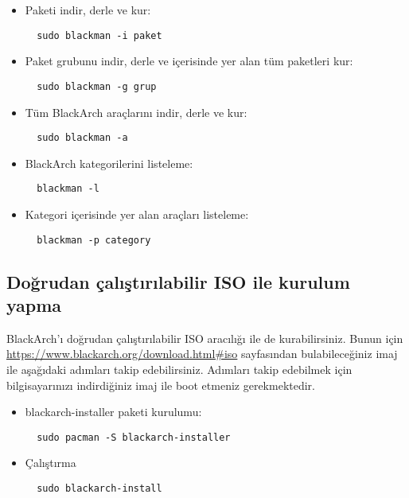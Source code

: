 \documentclass[a4paper, oneside, 11pt]{book}
\begin{document}
\begin{itemize}
\item Paketi indir, derle ve kur:
\begin{lstlisting}
  sudo blackman -i paket
\end{lstlisting}

\item Paket grubunu indir, derle ve içerisinde yer alan tüm paketleri kur:
\begin{lstlisting}
  sudo blackman -g grup
\end{lstlisting}

\item Tüm BlackArch araçlarını indir, derle ve kur:
\begin{lstlisting}
  sudo blackman -a
\end{lstlisting}

\item BlackArch kategorilerini listeleme:
\begin{lstlisting}
  blackman -l
\end{lstlisting}

\item Kategori içerisinde yer alan araçları listeleme:
\begin{lstlisting}
  blackman -p category
\end{lstlisting}

\end{itemize}

\subsection{Doğrudan çalıştırılabilir ISO ile kurulum yapma}
BlackArch'ı doğrudan çalıştırılabilir ISO aracılığı ile de kurabilirsiniz. Bunun için \url{https://www.blackarch.org/download.html#iso} sayfasından bulabileceğiniz imaj ile aşağıdaki adımları takip edebilirsiniz. Adımları takip edebilmek için bilgisayarınızı indirdiğiniz imaj ile boot etmeniz gerekmektedir.

\begin{itemize}
\item blackarch-installer paketi kurulumu:
\begin{lstlisting}
  sudo pacman -S blackarch-installer
\end{lstlisting}

\item Çalıştırma
\begin{lstlisting}
  sudo blackarch-install
\end{lstlisting}

\end{itemize}
\end{document}
